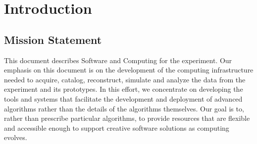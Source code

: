 \documentclass[../main-v1.tex]{subfiles}
\begin{document}















\chapter{Introduction  }
\label{ch:intro}


\listoftodos

\section{Mission Statement}
This document describes Software and Computing for the  experiment. Our emphasis on this document is on the development of the computing infrastructure needed to acquire, catalog, reconstruct, simulate and analyze the data from the  experiment and its prototypes. In this effort, we concentrate on developing the tools and systems that facilitate the development and deployment of advanced algorithms rather than the details of the algorithms themselves. Our goal is to, rather than prescribe particular algorithms, to provide resources that are flexible and accessible enough to support creative software solutions as  computing evolves. 
\end{document}
